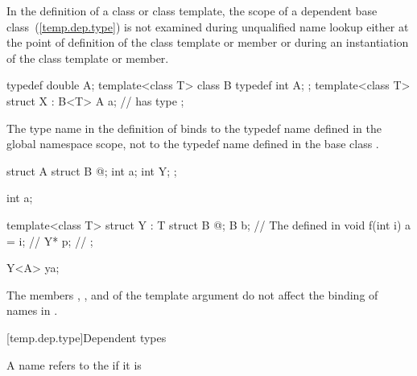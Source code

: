 \pnum
In the definition of a class or class template,
the scope of a dependent base class~(\ref{temp.dep.type})
is not examined during unqualified
name lookup either at the point of definition of the
class template or member or during an instantiation of
the class template or member.
\begin{example}

\begin{codeblock}
typedef double A;
template<class T> class B {
  typedef int A;
};
template<class T> struct X : B<T> {
  A a;              //  has type 
};
\end{codeblock}

The type name
in the definition of
binds to the typedef name defined in the global
namespace scope, not to the typedef name
defined in the base class
.
\end{example}
\begin{example}

\begin{codeblock}
struct A {
  struct B { @\commentellip@ };
  int a;
  int Y;
};

int a;

template<class T> struct Y : T {
  struct B { @\commentellip@ };
  B b;                          // The  defined in 
  void f(int i) { a = i; }      // 
  Y* p;                         // 
};

Y<A> ya;
\end{codeblock}

The members
,
,
and
of the template argument
do not affect the binding of names in
.
\end{example}

[temp.dep.type]{Dependent types}

\pnum
A name refers to the
if it is

